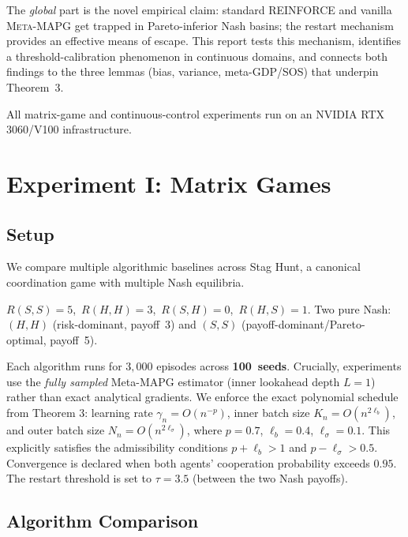 \documentclass[11pt,a4paper]{article}
\newcommand{\MAPG}{\textsc{Meta-MAPG}}
\theoremstyle{remark}
\begin{document}
The \emph{global} part is the novel empirical claim: standard REINFORCE and
vanilla \MAPG{} get trapped in Pareto-inferior Nash basins; the restart
mechanism provides an effective means of escape.
This report tests this mechanism, identifies a threshold-calibration
phenomenon in continuous domains, and connects both findings to the
three lemmas (bias, variance, meta-GDP/SOS) that underpin Theorem~3.

All matrix-game and continuous-control experiments run on an
NVIDIA RTX 3060/V100 infrastructure.

\section{Experiment I: Matrix Games}
\label{sec:matrix}

\subsection{Setup}

We compare multiple algorithmic baselines across Stag Hunt, a canonical coordination game with multiple Nash equilibria.

\begin{description}[leftmargin=2em,itemsep=3pt]
  \item[Stag Hunt.]
    $R(S,S)=5$,\ $R(H,H)=3$,\ $R(S,H)=0$,\ $R(H,S)=1$.
    Two pure Nash: $(H,H)$ (risk-dominant, payoff~3)
    and $(S,S)$ (payoff-dominant/Pareto-optimal, payoff~5).
\end{description}

\noindent
Each algorithm runs for $3{,}000$ episodes across \textbf{100~seeds}.
Crucially, experiments use the \emph{fully sampled} Meta-MAPG estimator 
(inner lookahead depth $L=1$) rather than exact analytical gradients. 
We enforce the exact polynomial schedule from Theorem 3: 
learning rate $\gamma_n = O(n^{-p})$, inner batch size $K_n = O(n^{2\ell_b})$, 
and outer batch size $N_n = O(n^{2\ell_\sigma})$, where $p=0.7$, $\ell_b=0.4$, $\ell_\sigma=0.1$.
This explicitly satisfies the admissibility conditions $p+\ell_b>1$ and $p-\ell_\sigma>0.5$.
Convergence is declared when both agents' cooperation probability exceeds
$0.95$. The restart threshold is set to $\tau=3.5$ (between the two Nash payoffs).

\subsection{Algorithm Comparison}
\end{document}
